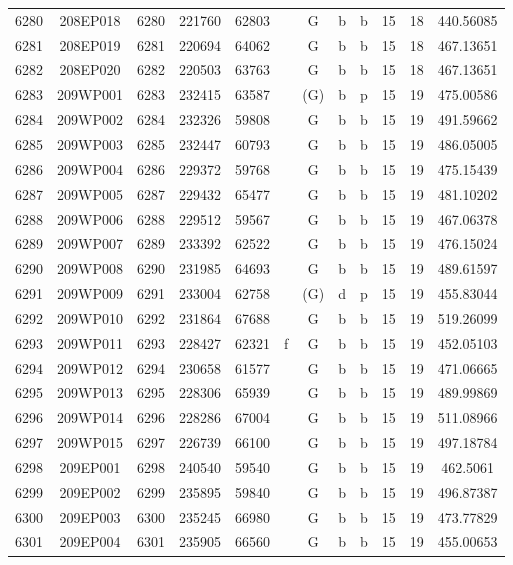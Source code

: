 \begin{tabular}{|*{12}{c|}}
6280 & 208EP018 & 6280 & 221760 & 62803 &  & G & b & b & 15 & 18 & 440.56085 \\ 
6281 & 208EP019 & 6281 & 220694 & 64062 &  & G & b & b & 15 & 18 & 467.13651 \\ 
6282 & 208EP020 & 6282 & 220503 & 63763 &  & G & b & b & 15 & 18 & 467.13651 \\ 
6283 & 209WP001 & 6283 & 232415 & 63587 &  & (G) & b & p & 15 & 19 & 475.00586 \\ 
6284 & 209WP002 & 6284 & 232326 & 59808 &  & G & b & b & 15 & 19 & 491.59662 \\ 
6285 & 209WP003 & 6285 & 232447 & 60793 &  & G & b & b & 15 & 19 & 486.05005 \\ 
6286 & 209WP004 & 6286 & 229372 & 59768 &  & G & b & b & 15 & 19 & 475.15439 \\ 
6287 & 209WP005 & 6287 & 229432 & 65477 &  & G & b & b & 15 & 19 & 481.10202 \\ 
6288 & 209WP006 & 6288 & 229512 & 59567 &  & G & b & b & 15 & 19 & 467.06378 \\ 
6289 & 209WP007 & 6289 & 233392 & 62522 &  & G & b & b & 15 & 19 & 476.15024 \\ 
6290 & 209WP008 & 6290 & 231985 & 64693 &  & G & b & b & 15 & 19 & 489.61597 \\ 
6291 & 209WP009 & 6291 & 233004 & 62758 &  & (G) & d & p & 15 & 19 & 455.83044 \\ 
6292 & 209WP010 & 6292 & 231864 & 67688 &  & G & b & b & 15 & 19 & 519.26099 \\ 
6293 & 209WP011 & 6293 & 228427 & 62321 & f & G & b & b & 15 & 19 & 452.05103 \\ 
6294 & 209WP012 & 6294 & 230658 & 61577 &  & G & b & b & 15 & 19 & 471.06665 \\ 
6295 & 209WP013 & 6295 & 228306 & 65939 &  & G & b & b & 15 & 19 & 489.99869 \\ 
6296 & 209WP014 & 6296 & 228286 & 67004 &  & G & b & b & 15 & 19 & 511.08966 \\ 
6297 & 209WP015 & 6297 & 226739 & 66100 &  & G & b & b & 15 & 19 & 497.18784 \\ 
6298 & 209EP001 & 6298 & 240540 & 59540 &  & G & b & b & 15 & 19 & 462.5061 \\ 
6299 & 209EP002 & 6299 & 235895 & 59840 &  & G & b & b & 15 & 19 & 496.87387 \\ 
6300 & 209EP003 & 6300 & 235245 & 66980 &  & G & b & b & 15 & 19 & 473.77829 \\ 
6301 & 209EP004 & 6301 & 235905 & 66560 &  & G & b & b & 15 & 19 & 455.00653 \\ 

\end{tabular}
